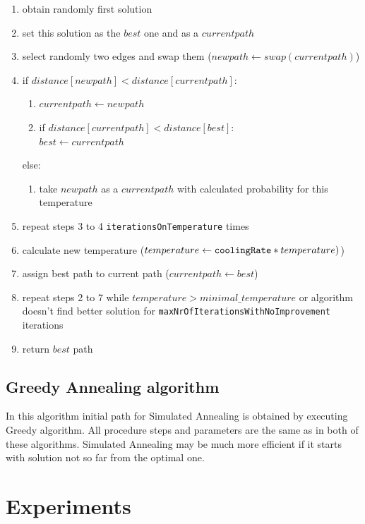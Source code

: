 \documentclass[titlepage]{article}
\begin{document}
\begin{enumerate}
	\item obtain randomly first solution
	\item set this solution as the $best$ one and as a $currentpath$
	\item select randomly two edges and swap them ($newpath \leftarrow swap(currentpath)$)
	\item if $distance[newpath] < distance[currentpath]$:
	\begin{enumerate}[label*=\arabic*.]
		\item $currentpath \leftarrow newpath$
		\item if $distance[currentpath] < distance[best]$: \\
		\hspace*{5mm} $best \leftarrow currentpath$
	\end{enumerate}
	else:
	\begin{enumerate}[label*=\arabic*.]
		\item take $newpath$ as a $currentpath$ with calculated probability for this temperature
	\end{enumerate}
	\item repeat steps 3 to 4 \texttt{iterationsOnTemperature} times
	\item calculate new temperature ($temperature \leftarrow \mbox{\texttt{coolingRate}}*temperature)$)
	\item assign best path to current path ($currentpath \leftarrow best$)
	\item repeat steps 2 to 7 while $temperature > minimal\_temperature$ or algorithm doesn't find better solution for \texttt{maxNrOfIterationsWithNoImprovement} iterations
	\item return $best$ path
	
\end{enumerate}

\subsection{Greedy Annealing algorithm}

In this algorithm initial path for Simulated Annealing is obtained by executing Greedy algorithm. All procedure steps and parameters are the same as in both of these algorithms. Simulated Annealing may be much more efficient if it starts with solution not so far from the optimal one. 

\section{Experiments}
\end{document}
